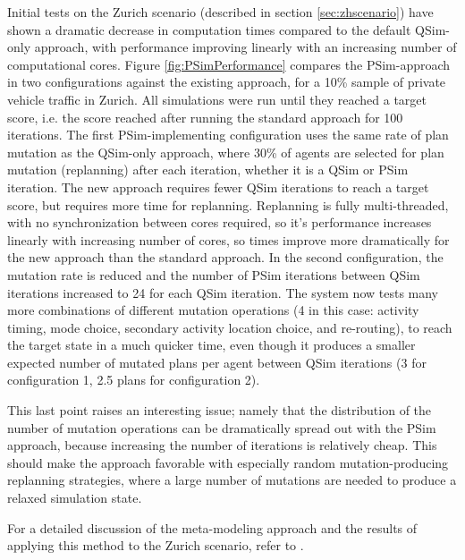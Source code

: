 Initial tests on the Zurich scenario (described in section \ref{sec:zhscenario}) have shown a dramatic decrease in computation times compared to the default QSim-only approach, with performance improving linearly with an increasing number of computational cores.
Figure \ref{fig:PSimPerformance} compares the PSim-approach in two configurations against the existing approach, for a 10\% sample of private vehicle traffic in Zurich. All simulations were run until they reached a target score, i.e. the score reached after running the standard approach for 100 iterations. The first PSim-implementing configuration uses the same rate of plan mutation as the QSim-only approach, where 30\% of agents are selected for plan mutation (replanning) after each iteration, whether it is a QSim or PSim iteration. The new approach requires fewer QSim iterations to reach a target score, but requires more time for replanning. Replanning is fully multi-threaded, with no synchronization between cores required, so it’s performance increases linearly with increasing number of cores, so times improve more dramatically for the new approach than the standard approach.
In the second configuration, the mutation rate is reduced and the number of PSim iterations between QSim iterations increased to 24 for each QSim iteration. The system now tests many more combinations of different mutation operations (4 in this case: activity timing, mode choice, secondary activity location choice, and re-routing), to reach the target state in a much quicker time, even though it produces a smaller expected number of mutated plans per agent between QSim iterations (3 for configuration 1, 2.5 plans for configuration 2).

This last point raises an interesting issue; namely that the distribution of the number of mutation operations can be dramatically spread out with the PSim approach, because increasing the number of iterations is relatively cheap. This should make the approach favorable with especially random mutation-producing replanning strategies, where a large number of mutations are needed to produce a relaxed simulation state.

For a detailed discussion of the meta-modeling approach and the results of applying this method to the Zurich scenario, refer to .

